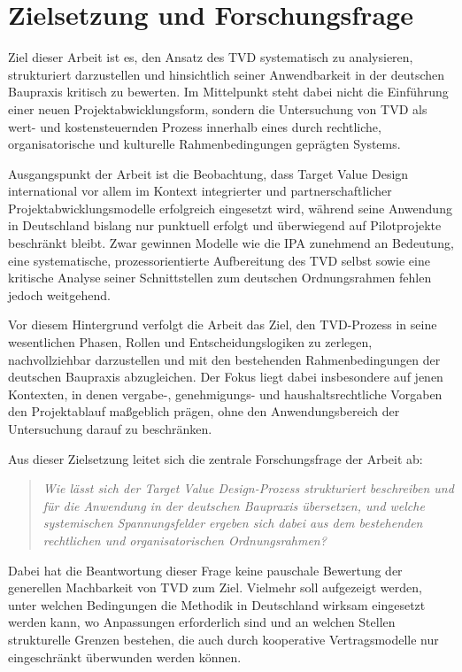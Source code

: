 \section{Zielsetzung und Forschungsfrage}
\label{sec:1.2}

Ziel dieser Arbeit ist es, den Ansatz des \acf{TVD} systematisch zu analysieren, strukturiert darzustellen und hinsichtlich seiner Anwendbarkeit in der deutschen Baupraxis kritisch zu bewerten. Im Mittelpunkt steht dabei nicht die Einführung einer neuen Projektabwicklungsform, sondern die Untersuchung von \ac{TVD} als wert- und kostensteuernden Prozess innerhalb eines durch rechtliche, organisatorische und kulturelle Rahmenbedingungen geprägten Systems.

Ausgangspunkt der Arbeit ist die Beobachtung, dass Target Value Design international vor allem im Kontext integrierter und partnerschaftlicher Projektabwicklungsmodelle erfolgreich eingesetzt wird, während seine Anwendung in Deutschland bislang nur punktuell erfolgt und überwiegend auf Pilotprojekte beschränkt bleibt. Zwar gewinnen Modelle wie die \acs{IPA} zunehmend an Bedeutung, eine systematische, prozessorientierte Aufbereitung des \ac{TVD} selbst sowie eine kritische Analyse seiner Schnittstellen zum deutschen Ordnungsrahmen fehlen jedoch weitgehend.

Vor diesem Hintergrund verfolgt die Arbeit das Ziel, den \ac{TVD}-Prozess in seine wesentlichen Phasen, Rollen und Entscheidungslogiken zu zerlegen, nachvollziehbar darzustellen und mit den bestehenden Rahmenbedingungen der deutschen Baupraxis abzugleichen. Der Fokus liegt dabei insbesondere auf jenen Kontexten, in denen vergabe-, genehmigungs- und haushaltsrechtliche Vorgaben den Projektablauf maßgeblich prägen, ohne den Anwendungsbereich der Untersuchung darauf zu beschränken.

Aus dieser Zielsetzung leitet sich die zentrale Forschungsfrage der Arbeit ab:

\begin{quote}
    \textit{Wie lässt sich der Target Value Design-Prozess strukturiert beschreiben und für die Anwendung in der deutschen Baupraxis übersetzen, und welche systemischen Spannungsfelder ergeben sich dabei aus dem bestehenden rechtlichen und organisatorischen Ordnungsrahmen?}
\end{quote}
Dabei hat die Beantwortung dieser Frage keine pauschale Bewertung der generellen Machbarkeit von \ac{TVD} zum Ziel. Vielmehr soll aufgezeigt werden, unter welchen Bedingungen die Methodik in Deutschland wirksam eingesetzt werden kann, wo Anpassungen erforderlich sind und an welchen Stellen strukturelle Grenzen bestehen, die auch durch kooperative Vertragsmodelle nur eingeschränkt überwunden werden können.

